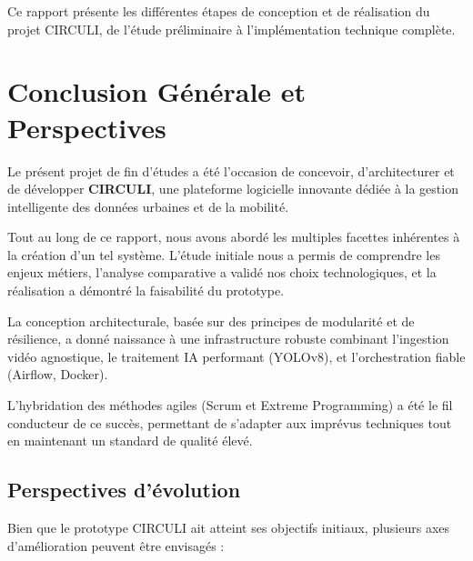 \documentclass[12pt, a4paper]{report}
\begin{document}
Ce rapport présente les différentes étapes de conception et de réalisation du projet CIRCULI, de l'étude préliminaire à l'implémentation technique complète.

\clearpage







\appendix


\chapter*{Conclusion Générale et Perspectives}

Le présent projet de fin d'études a été l'occasion de concevoir, d'architecturer et de développer \textbf{CIRCULI}, une plateforme logicielle innovante dédiée à la gestion intelligente des données urbaines et de la mobilité.

Tout au long de ce rapport, nous avons abordé les multiples facettes inhérentes à la création d'un tel système. L'étude initiale nous a permis de comprendre les enjeux métiers, l'analyse comparative a validé nos choix technologiques, et la réalisation a démontré la faisabilité du prototype.

La conception architecturale, basée sur des principes de modularité et de résilience, a donné naissance à une infrastructure robuste combinant l'ingestion vidéo agnostique, le traitement IA performant (YOLOv8), et l'orchestration fiable (Airflow, Docker).

L'hybridation des méthodes agiles (Scrum et Extreme Programming) a été le fil conducteur de ce succès, permettant de s'adapter aux imprévus techniques tout en maintenant un standard de qualité élevé.

\section*{Perspectives d'évolution}

Bien que le prototype CIRCULI ait atteint ses objectifs initiaux, plusieurs axes d'amélioration peuvent être envisagés :
\end{document}
